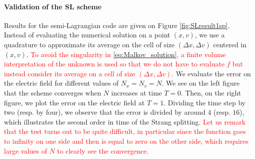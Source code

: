 \documentclass{article}
\numberwithin{equation}{section}
\newcommand{\todo}[1]{{\color{red}\textbf{#1}}}
\begin{document}



%	


\paragraph{Validation of the SL scheme}

Results for the semi-Lagrangian code are given on Figure \ref{fig:SLresult1sp}. Instead of evaluating the numerical solution on a point $(x,v)$, we use a quadrature to approximate its average on the cell of size $(\Delta x, \Delta v)$ centered in $(x,v)$.  
\textcolor{red}{To avoid the singularity in \eqref{eq:Malkov_solution}, a finite volume interpretation of the unknown is used so that we do not 
have to evaluate $f$ but instead consider its average on a cell of size $(\Delta x, \Delta v)$.} 
We evaluate the error on the electric field for different values of $N_x=N_v=N$. We see on the left figure that the scheme converges when $N$ increases at  time $T=0$.
Then, on the right figure, we plot the error on the electric field at $T=1$. Dividing the time step by two (resp. by four), we observe that the error is divided by around $4$ (resp. $16$), which illustrates the second order in time of the Strang splitting. \textcolor{red}{Let us remark that 
the test turns out to be quite difficult, in particular since the function goes to infinity on one side and then is equal to zero on the other side, 
which requires large values of $N$ to clearly see the convergence.}
\end{document}
